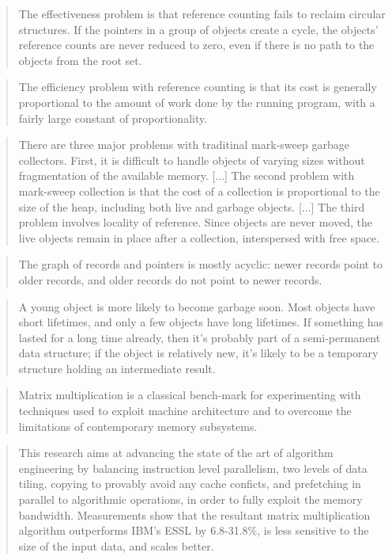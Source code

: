 \documentclass[a4paper,oneside]{memoir}
\begin{document}
\blockquote{The effectiveness problem is that reference counting fails to reclaim
circular structures. If the pointers in a group of objects create a cycle, the
objects' reference counts are never reduced to zero, even if there is no path
to the objects from the root set. \cite{Wilson:1992}}


\blockquote{The efficiency problem with reference counting is that its cost is
generally proportional to the amount of work done by the running program, with a
fairly large constant of proportionality.}
\cite{Wilson:1992}

\blockquote{There are three major problems with traditinal mark-sweep garbage
collectors. First, it is difficult to handle objects of varying sizes without
fragmentation of the available memory. [...] The second problem with mark-sweep
collection is that the cost of a collection is proportional to the size of the
heap, including both live and garbage objects. [...] The third problem involves
locality of reference. Since objects are never moved, the live objects remain in
place after a collection, interspersed with free space. \cite{Wilson:1992}}

\blockquote{The graph of records and pointers is mostly acyclic: newer records
point to older records, and older records do not point to newer records.}
\cite{Appel:1989}

\blockquote{A young object is more likely to become garbage soon. Most objects
have short lifetimes, and only a few objects have long lifetimes. If something
has lasted for a long time already, then it’s probably part of a semi-permanent
data structure; if the object is relatively new, it’s likely to be a temporary
structure holding an intermediate result. \cite{Appel:1989}}

\blockquote{Matrix multiplication is a classical bench-mark for experimenting
with techniques used to exploit machine architecture and to overcome the
limitations of contemporary memory subsystems.}
\cite{Eiron:1999}

\blockquote{This research aims at advancing the state of the art of algorithm
engineering by balancing instruction level parallelism, two levels of data
tiling, copying to provably avoid any cache conficts, and prefetching in
parallel to algorithmic operations, in order to fully exploit the memory
bandwidth. Measurements show that the resultant matrix multiplication algorithm
outperforms IBM's ESSL by 6.8-31.8\%, is less sensitive to the size of the
input data, and scales better. \cite{Eiron:1999}}
\end{document}

